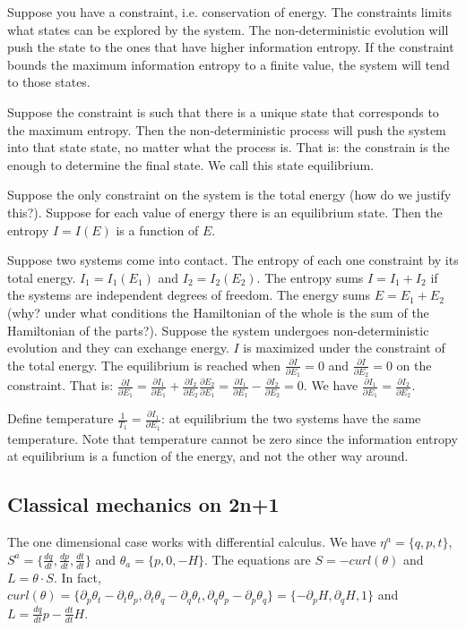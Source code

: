 \documentclass[11pt,letterpaper,fleqn]{memoir} %
\begin{document}
Suppose you have a constraint, i.e. conservation of energy. The constraints limits what states can be explored by the system. The non-deterministic evolution will push the state to the ones that have higher information entropy. If the constraint bounds the maximum information entropy to a finite value, the system will tend to those states.

Suppose the constraint is such that there is a unique state that corresponds to the maximum entropy. Then the non-deterministic process will push the system into that state state, no matter what the process is. That is: the constrain is the enough to determine the final state. We call this state equilibrium.

Suppose the only constraint on the system is the total energy (how do we justify this?). Suppose for each value of energy there is an equilibrium state. Then the entropy $I=I(E)$ is a function of $E$.

Suppose two systems come into contact. The entropy of each one constraint by its total energy. $I_1=I_1(E_1)$ and $I_2=I_2(E_2)$. The entropy sums $I=I_1+I_2$ if the systems are independent degrees of freedom. The energy sums $E=E_1+E_2$ (why? under what conditions the Hamiltonian of the whole is the sum of the Hamiltonian of the parts?). Suppose the system undergoes non-deterministic evolution and they can exchange energy. $I$ is maximized under the constraint of the total energy. The equilibrium is reached when $\frac{\partial I}{\partial E_1} = 0$ and $\frac{\partial I}{\partial E_2} = 0$ on the constraint. That is: $\frac{\partial I}{\partial E_1} = \frac{\partial I_1}{\partial E_1} +\frac{\partial I_2}{\partial E_2} \frac{\partial E_2}{\partial E_1} = \frac{\partial I_1}{\partial E_1} -\frac{\partial I_2}{\partial E_2}=0$. We have $\frac{\partial I_1}{\partial E_1} = \frac{\partial I_2}{\partial E_2}$.

Define temperature $\frac{1}{T_1} = \frac{\partial I_1}{\partial E_1}$: at equilibrium the two systems have the same temperature. Note that temperature cannot be zero since the information entropy at equilibrium is a function of the energy, and not the other way around.

\subsection{Classical mechanics on 2n+1}
The one dimensional case works with differential calculus. We have $\eta^a=\{q,p,t\}$, $S^a=\{\frac{dq}{dt},\frac{dp}{dt},\frac{dt}{dt}\}$ and $\theta_a=\{p,0,-H\}$. The equations are $S=-curl(\theta)$ and $L=\theta \cdot S$. In fact, $curl(\theta)=\{\partial_p \theta_t - \partial_t \theta_p, \partial_t \theta_q - \partial_q \theta_t, \partial_q \theta_p - \partial_p \theta_q\} = \{ -\partial_p H , \partial_q H , 1 \}$ and $L = \frac{dq}{dt}p - \frac{dt}{dt}H$.
\end{document}
